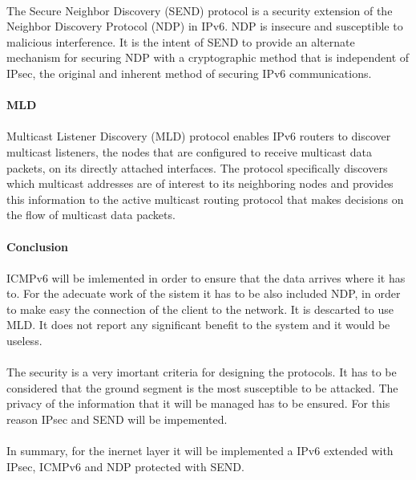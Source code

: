 \paragraph{}
The Secure Neighbor Discovery (SEND) protocol is a security extension of the Neighbor Discovery Protocol (NDP) in IPv6. NDP is insecure and susceptible to malicious interference. It is the intent of SEND to provide an alternate mechanism for securing NDP with a cryptographic method that is independent of IPsec, the original and inherent method of securing IPv6 communications.

\paragraph{} \textbf{MLD}
\paragraph{}
Multicast Listener Discovery (MLD) protocol enables IPv6 routers to discover multicast listeners, the nodes that are configured to receive multicast data packets, on its directly attached interfaces. The protocol specifically discovers which multicast addresses are of interest to its neighboring nodes and provides this information to the active multicast routing protocol that makes decisions on the flow of multicast data packets. 


\paragraph{} \textbf{Conclusion}
\paragraph{}
ICMPv6 will be imlemented in order to ensure that the data arrives where it has to. For the adecuate work of the sistem it has to be also included  NDP, in order to make easy the connection of the client to the network. It is descarted to use MLD. It does not report any significant benefit to the system and it would be useless.
\paragraph{}
The security is a very imortant criteria for designing the protocols. It has to be considered that the ground segment is the most susceptible to be attacked. The privacy of the information that it will be managed has to be ensured. For this reason IPsec and SEND will be impemented.
\paragraph{}
In summary, for the inernet layer it will be implemented a IPv6 extended with IPsec, ICMPv6 and NDP protected with SEND.

